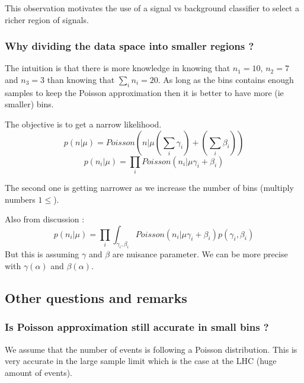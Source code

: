 This observation motivates the use of a signal vs background classifier to select a richer region of signals. 







\subsubsection{Why dividing the data space into smaller regions ?}


The intuition is that there is more knowledge in knowing that $n_1 = 10$, $n_2 = 7$ and $n_3 = 3$ than knowing that $\sum_i n_i = 20$.
As long as the bins contains enough samples to keep the Poisson approximation then it is better to have more (ie smaller) bins.

The objective is to get a narrow likelihood.
\begin{equation}
    p(n | \mu) = Poisson(n | \mu (\sum_i \gamma_i) + (\sum_i \beta_i))
\end{equation}
\begin{equation}
    p({n_i} | \mu) = \prod_i Poisson(n_i | \mu \gamma_i + \beta_i)
\end{equation}

The second one is getting narrower as we increase the number of bins (multiply numbers $ 1 \leq $).

Also from discussion :
\begin{equation}
    p({n_i} | \mu) = \prod_i \int_{\gamma_i, \beta_i} Poisson(n_i | \mu \gamma_i + \beta_i) p(\gamma_i, \beta_i)
\end{equation}
But this is assuming $\gamma$ and $\beta$ are nuisance parameter.
We can be more precise with $\gamma(\alpha)$ and $\beta(\alpha)$.







\subsection{Other questions and remarks} %
\label{sub:other_questions_and_remarks}

\subsubsection{Is Poisson approximation still accurate in small bins ?} %

We assume that the number of events is following a Poisson distribution.
This is very accurate in the large sample limit which is the case at the LHC (huge amount of events).

